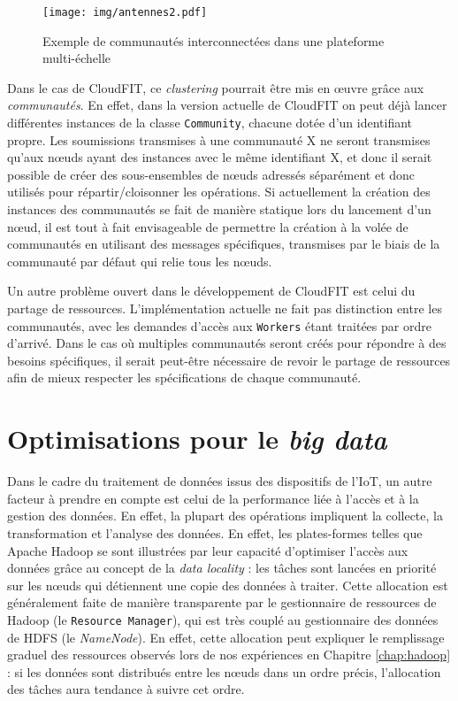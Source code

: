 \begin{figure}[!ht]
	\centering
	\texttt{[image: img/antennes2.pdf]}
	\caption{Exemple de communautés interconnectées dans une plateforme multi-échelle}
	\label{fig:antennes}
\end{figure}


Dans le cas de CloudFIT, ce \textit{clustering} pourrait être mis en {\oe}uvre grâce aux \textit{communautés}. En effet, dans la version actuelle de CloudFIT on peut déjà lancer différentes instances de la classe \texttt{Community}, chacune dotée d'un identifiant propre. Les soumissions transmises à une communauté X ne seront transmises qu'aux n{\oe}uds ayant des instances avec le même identifiant X, et donc il serait possible de créer des sous-ensembles de n{\oe}uds adressés séparément et donc utilisés pour répartir/cloisonner les opérations. Si actuellement la création des instances des communautés se fait de manière statique lors du lancement d'un n{\oe}ud, il est tout à fait envisageable de permettre la création à la volée de communautés en utilisant des messages spécifiques, transmises par le biais de la communauté par défaut qui relie tous les n{\oe}uds.  

Un autre problème ouvert dans le développement de CloudFIT est celui du partage de ressources. L'implémentation actuelle ne fait pas distinction entre les communautés, avec les demandes d'accès aux \texttt{Workers} étant traitées par ordre d'arrivé. Dans le cas où multiples communautés seront créés pour répondre à des besoins spécifiques, il serait peut-être nécessaire de revoir le partage de ressources afin de mieux respecter les spécifications de chaque communauté. 

 

\section{Optimisations pour le \textit{big data}\label{sec:datalocality}}
%
Dans le cadre du traitement de données issus des dispositifs de l'IoT, un autre facteur à prendre en compte est celui de la performance liée à l'accès et à la gestion des données. En effet, la plupart des opérations impliquent la collecte, la transformation et l'analyse des données. En effet, les plates-formes telles que Apache Hadoop se sont illustrées par leur capacité d'optimiser l'accès aux données grâce au concept de la \textit{data locality} : les tâches sont lancées en priorité sur les n{\oe}uds qui détiennent une copie des données à traiter. Cette allocation est généralement faite de manière transparente par le gestionnaire de ressources de Hadoop (le \texttt{Resource Manager}), qui est très couplé au gestionnaire des données de HDFS (le \textit{NameNode}). En effet, cette allocation peut expliquer le remplissage graduel des ressources observés lors de nos expériences en Chapitre \ref{chap:hadoop} : si les données sont distribués entre les n{\oe}uds dans un ordre précis, l'allocation des tâches aura tendance à suivre cet ordre.

